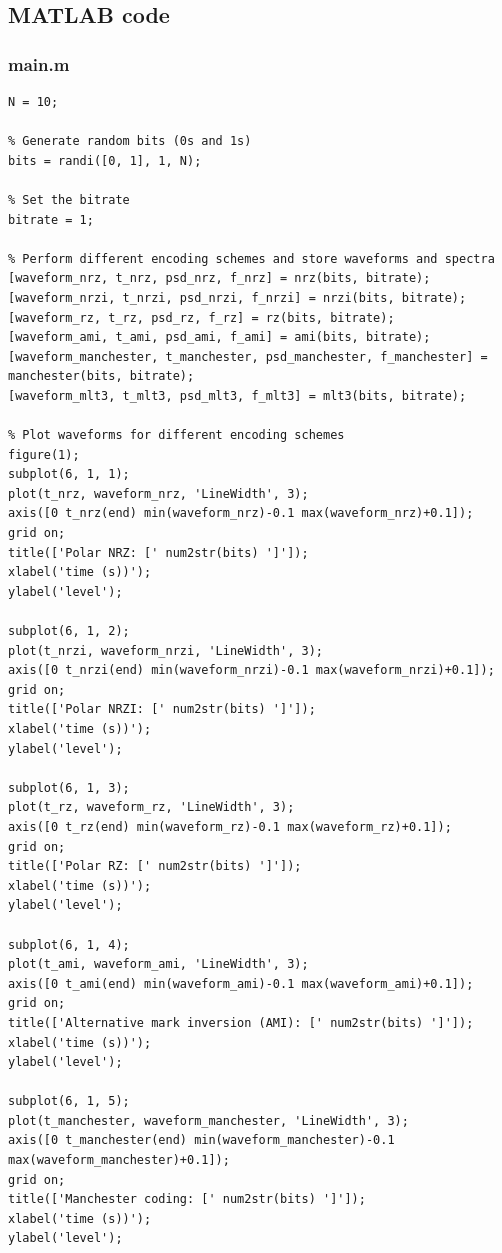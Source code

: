 \documentclass[a4paper, 12pt, english]{article}
\begin{document}
\newpage
\subsection{MATLAB code}
\subsubsection{main.m}
\begin{lstlisting}[style=matlab]
% Define the number of bits
N = 10;

% Generate random bits (0s and 1s)
bits = randi([0, 1], 1, N);

% Set the bitrate
bitrate = 1;

% Perform different encoding schemes and store waveforms and spectra
[waveform_nrz, t_nrz, psd_nrz, f_nrz] = nrz(bits, bitrate);
[waveform_nrzi, t_nrzi, psd_nrzi, f_nrzi] = nrzi(bits, bitrate);
[waveform_rz, t_rz, psd_rz, f_rz] = rz(bits, bitrate);
[waveform_ami, t_ami, psd_ami, f_ami] = ami(bits, bitrate);
[waveform_manchester, t_manchester, psd_manchester, f_manchester] = manchester(bits, bitrate);
[waveform_mlt3, t_mlt3, psd_mlt3, f_mlt3] = mlt3(bits, bitrate);

% Plot waveforms for different encoding schemes
figure(1);
subplot(6, 1, 1);
plot(t_nrz, waveform_nrz, 'LineWidth', 3);
axis([0 t_nrz(end) min(waveform_nrz)-0.1 max(waveform_nrz)+0.1]);
grid on;
title(['Polar NRZ: [' num2str(bits) ']']);
xlabel('time (s))');
ylabel('level');

subplot(6, 1, 2);
plot(t_nrzi, waveform_nrzi, 'LineWidth', 3);
axis([0 t_nrzi(end) min(waveform_nrzi)-0.1 max(waveform_nrzi)+0.1]);
grid on;
title(['Polar NRZI: [' num2str(bits) ']']);
xlabel('time (s))');
ylabel('level');

subplot(6, 1, 3);
plot(t_rz, waveform_rz, 'LineWidth', 3);
axis([0 t_rz(end) min(waveform_rz)-0.1 max(waveform_rz)+0.1]);
grid on;
title(['Polar RZ: [' num2str(bits) ']']);
xlabel('time (s))');
ylabel('level');

subplot(6, 1, 4);
plot(t_ami, waveform_ami, 'LineWidth', 3);
axis([0 t_ami(end) min(waveform_ami)-0.1 max(waveform_ami)+0.1]);
grid on;
title(['Alternative mark inversion (AMI): [' num2str(bits) ']']);
xlabel('time (s))');
ylabel('level');

subplot(6, 1, 5);
plot(t_manchester, waveform_manchester, 'LineWidth', 3);
axis([0 t_manchester(end) min(waveform_manchester)-0.1 max(waveform_manchester)+0.1]);
grid on;
title(['Manchester coding: [' num2str(bits) ']']);
xlabel('time (s))');
ylabel('level');


\end{lstlisting}
\end{document}
